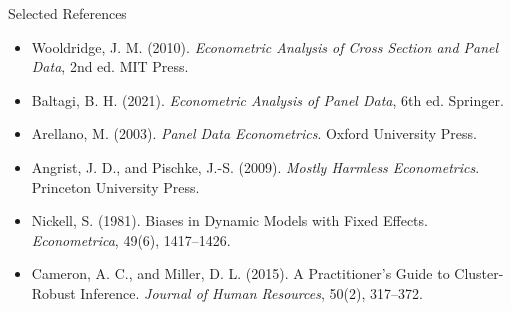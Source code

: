\documentclass[aspectratio=169,11pt]{beamer}
\begin{document}
\begin{frame}{Selected References}
\small
\begin{itemize}
\item Wooldridge, J. M. (2010). \textit{Econometric Analysis of Cross Section and Panel Data}, 2nd ed. MIT Press.
\item Baltagi, B. H. (2021). \textit{Econometric Analysis of Panel Data}, 6th ed. Springer.
\item Arellano, M. (2003). \textit{Panel Data Econometrics}. Oxford University Press.
\item Angrist, J. D., and Pischke, J.-S. (2009). \textit{Mostly Harmless Econometrics}. Princeton University Press.
\item Nickell, S. (1981). Biases in Dynamic Models with Fixed Effects. \textit{Econometrica}, 49(6), 1417--1426.
\item Cameron, A. C., and Miller, D. L. (2015). A Practitioner's Guide to Cluster-Robust Inference. \textit{Journal of Human Resources}, 50(2), 317--372.
\end{itemize}
\end{frame}

\contactslide
\end{document}
